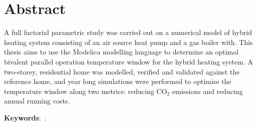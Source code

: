 

\begingroup
\let\clearpage\relax
\let\cleardoublepage\relax
\let\cleardoublepage\relax

\chapter*{Abstract}

A full factorial parametric study was carried out on a numerical model of hybrid heating system consisting of an air source heat pump and a gas boiler with. This thesis aims to use the Modelica modelling language to determine an optimal bivalent parallel operation temperature window for the hybrid heating system. A two-storey, residential home was modelled, verified and validated against the reference home, and year long simulations were performed to optimise the temperature window along two metrics: reducing $\text{CO}_2$ emissions and reducing annual running costs. 

\bigskip\bigskip\bigskip\bigskip
\textbf{Keywords}:~\mykeywords.



\endgroup

